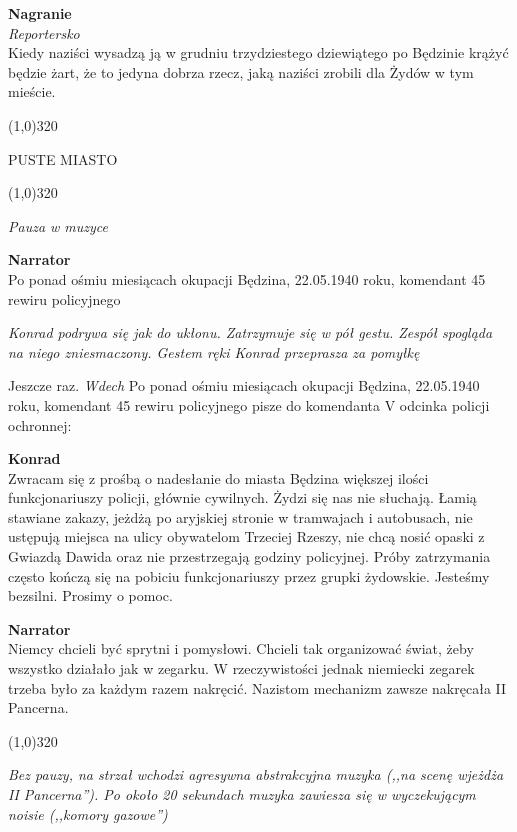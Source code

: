 \documentclass[11pt,a4paper,oneside]{article}
\begin{document}
\textbf{Nagranie}\\
{\color{light-gray} \emph{Reportersko}}\\
Kiedy naziści wysadzą ją w grudniu trzydziestego dziewiątego po
Będzinie krążyć będzie żart, że to jedyna dobrza rzecz, jaką naziści
zrobili dla Żydów w tym mieście.

\line(1,0){320}

{\color{red}
PUSTE MIASTO
}

\line(1,0){320}

{\color{light-gray} \emph{Pauza w muzyce}}

\textbf{Narrator}\\
Po ponad ośmiu miesiącach okupacji Będzina, 22.05.1940 roku, komendant 45
rewiru policyjnego

{\color{light-gray} \emph{Konrad podrywa się jak do ukłonu. Zatrzymuje
się w pół gestu. Zespół spogląda na niego zniesmaczony. Gestem ręki
Konrad przeprasza za pomyłkę}}

Jeszcze raz. {\color{light-gray} \emph{Wdech}} Po ponad ośmiu
miesiącach okupacji Będzina, 22.05.1940 roku, komendant 45 rewiru
policyjnego pisze do komendanta V odcinka policji ochronnej:

{\color{konrad}
\textbf{Konrad}\\
Zwracam się z prośbą o nadesłanie do miasta Będzina większej ilości
funkcjonariuszy policji, głównie cywilnych. Żydzi się nas nie słuchają. Łamią
stawiane zakazy, jeżdżą po aryjskiej stronie w tramwajach i autobusach, nie
ustępują miejsca na ulicy obywatelom Trzeciej Rzeszy, nie chcą nosić opaski
z Gwiazdą Dawida oraz nie przestrzegają godziny policyjnej. Próby zatrzymania
często kończą się na pobiciu funkcjonariuszy przez grupki żydowskie. Jesteśmy 
bezsilni. Prosimy o pomoc.
}

\textbf{Narrator}\\
Niemcy chcieli być sprytni i pomysłowi. Chcieli tak organizować świat,
żeby wszystko działało jak w zegarku. W rzeczywistości jednak
niemiecki zegarek trzeba było za każdym razem nakręcić. Nazistom
mechanizm zawsze nakręcała II Pancerna. 

\line(1,0){320}

{\color{light-gray} \emph{Bez pauzy, na strzał wchodzi agresywna
abstrakcyjna muzyka (,,na scenę wjeżdża II Pancerna''). Po około 20
sekundach muzyka zawiesza się w wyczekującym noisie (,,komory
gazowe'')}}
\end{document}
